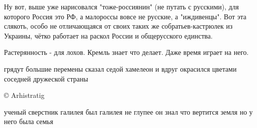 \begin{itemize}

Ну вот, выше уже нарисовался "тоже-россиянин" (не путать с русскими), для которого
Россия это РФ, а малороссы вовсе не русские, а "иждивенцы". Вот эта слякоть, особо
не отличающаяся от своих таких же собратьев-кастрюлек из Украины, чётко работает
на раскол России и общерусского единства.


Растерянность - для лохов. Кремль знает что делает. Даже время играет на него.


\obeycr
грядут большие перемены
сказал седой хамелеон
и вдруг окрасился цветами
соседней дружеской страны
\restorecr

© Arhistratig


\obeycr
ученый сверстник галилея
был галилея не глупее
он знал что вертится земля
но у него была семья
\restorecr

\end{itemize} %

